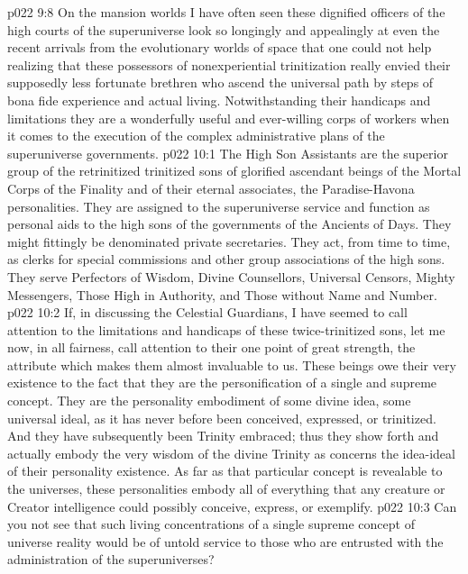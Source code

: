\vs p022 9:8 On the mansion worlds I have often seen these dignified officers of the high courts of the superuniverse look so longingly and appealingly at even the recent arrivals from the evolutionary worlds of space that one could not help realizing that these possessors of nonexperiential trinitization really envied their supposedly less fortunate brethren who ascend the universal path by steps of bona fide experience and actual living. Notwithstanding their handicaps and limitations they are a wonderfully useful and ever\hyp{}willing corps of workers when it comes to the execution of the complex administrative plans of the superuniverse governments.
\vs p022 10:1 The High Son Assistants are the superior group of the retrinitized trinitized sons of glorified ascendant beings of the Mortal Corps of the Finality and of their eternal associates, the Paradise\hyp{}Havona personalities. They are assigned to the superuniverse service and function as personal aids to the high sons of the governments of the Ancients of Days. They might fittingly be denominated private secretaries. They act, from time to time, as clerks for special commissions and other group associations of the high sons. They serve Perfectors of Wisdom, Divine Counsellors, Universal Censors, Mighty Messengers, Those High in Authority, and Those without Name and Number.
\vs p022 10:2 \pc If, in discussing the Celestial Guardians, I have seemed to call attention to the limitations and handicaps of these twice\hyp{}trinitized sons, let me now, in all fairness, call attention to their one point of great strength, the attribute which makes them almost invaluable to us. These beings owe their very existence to the fact that they are the personification of a single and supreme concept. They are the personality embodiment of some divine idea, some universal ideal, as it has never before been conceived, expressed, or trinitized. And they have subsequently been Trinity embraced; thus they show forth and actually embody the very wisdom of the divine Trinity as concerns the idea\hyp{}ideal of their personality existence. As far as that particular concept is revealable to the universes, these personalities embody all of everything that any creature or Creator intelligence could possibly conceive, express, or exemplify. 
\vs p022 10:3 Can you not see that such living concentrations of a single supreme concept of universe reality would be of untold service to those who are entrusted with the administration of the superuniverses?
